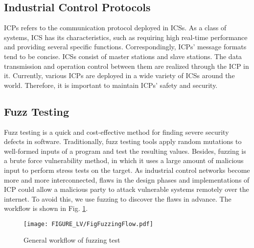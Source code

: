 \subsection{Industrial Control Protocols}
ICPs refers to the communication protocol deployed in ICSs. As a class of systems, ICS has its characteristics, such as requiring high real-time performance and providing several specific functions. Correspondingly, ICPs' message formats tend to be concise. ICSs consist of master stations and slave stations. The data transmission and operation control between them are realized through the ICP in it. Currently, various ICPs are deployed in a wide variety of ICSs around the world. Therefore, it is important to maintain ICPs' safety and security.

\subsection{Fuzz Testing}
Fuzz testing is a quick and cost-effective method for finding severe security defects in software. Traditionally, fuzz testing tools apply random mutations to well-formed inputs of a program and test the resulting values. Besides, fuzzing is a brute force vulnerability method, in which it uses a large amount of malicious input to perform stress tests on the target. As industrial control networks become more and more interconnected, flaws in the design phases and implementations of ICP could allow a malicious party to attack vulnerable systems remotely over the internet. To avoid this, we use fuzzing to discover the flaws in advance. The workflow is shown in Fig.  \ref{FigFuzzingFlow}.
\begin{figure}[htbp]
	\centering
	\texttt{[image: FIGURE\_LV/FigFuzzingFlow.pdf]}
	\caption{General workflow of fuzzing test}
	\label{FigFuzzingFlow}
\end{figure}

